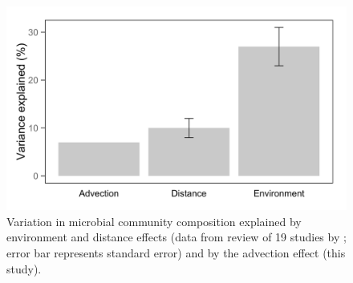 \begin{figure}
  \centering
  \includegraphics[width=\textwidth]{../generaldiscussion/biogeographybarchart.png}
  \caption[Biogeographic effect sizes]{Variation in microbial community composition explained by environment and distance effects (data from review of 19 studies by \citet{Hanson:2012cb}; error bar represents standard error) and by the advection effect (this study).}
  \label{fig:biogeographybarchart}
\end{figure}
